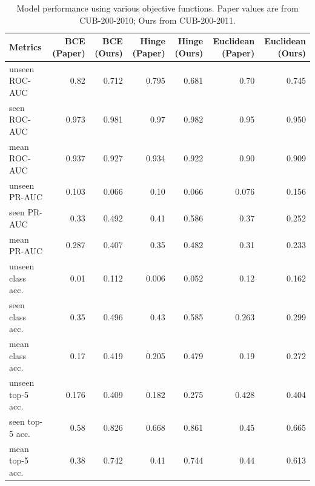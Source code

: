 
\begin{table}[t]
\centering
\scriptsize
\caption{Model performance using various objective functions. Paper values are from CUB-200-2010; Ours from CUB-200-2011.}
\label{tab:table2}
\begin{tabular}{lrrrrrr}
\toprule
Metrics & BCE (Paper) & BCE (Ours) & Hinge (Paper) & Hinge (Ours) & Euclidean (Paper) & Euclidean (Ours) \\ \midrule
unseen ROC-AUC & 0.82 & 0.712 & 0.795 & 0.681 & 0.70 & 0.745 \\
seen ROC-AUC & 0.973 & 0.981 & 0.97 & 0.982 & 0.95 & 0.950 \\
mean ROC-AUC & 0.937 & 0.927 & 0.934 & 0.922 & 0.90 & 0.909 \\
unseen PR-AUC & 0.103 & 0.066 & 0.10 & 0.066 & 0.076 & 0.156 \\
seen PR-AUC & 0.33 & 0.492 & 0.41 & 0.586 & 0.37 & 0.252 \\
mean PR-AUC & 0.287 & 0.407 & 0.35 & 0.482 & 0.31 & 0.233 \\
unseen class acc. & 0.01 & 0.112 & 0.006 & 0.052 & 0.12 & 0.162 \\
seen class acc. & 0.35 & 0.496 & 0.43 & 0.585 & 0.263 & 0.299 \\
mean class acc. & 0.17 & 0.419 & 0.205 & 0.479 & 0.19 & 0.272 \\
unseen top-5 acc. & 0.176 & 0.409 & 0.182 & 0.275 & 0.428 & 0.404 \\
seen top-5 acc. & 0.58 & 0.826 & 0.668 & 0.861 & 0.45 & 0.665 \\
mean top-5 acc. & 0.38 & 0.742 & 0.41 & 0.744 & 0.44 & 0.613 \\
 \bottomrule
\end{tabular}
\end{table}

